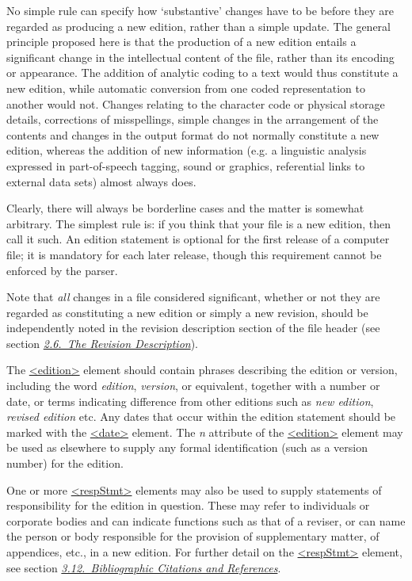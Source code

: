 No simple rule can specify how ‘substantive’ changes have to be before they are regarded as producing a new edition, rather than a simple update. The general principle proposed here is that the production of a new edition entails a significant change in the intellectual content of the file, rather than its encoding or appearance. The addition of analytic coding to a text would thus constitute a new edition, while automatic conversion from one coded representation to another would not. Changes relating to the character code or physical storage details, corrections of misspellings, simple changes in the arrangement of the contents and changes in the output format do not normally constitute a new edition, whereas the addition of new information (e.g. a linguistic analysis expressed in part-of-speech tagging, sound or graphics, referential links to external data sets) almost always does.\par
Clearly, there will always be borderline cases and the matter is somewhat arbitrary. The simplest rule is: if you think that your file is a new edition, then call it such. An edition statement is optional for the first release of a computer file; it is mandatory for each later release, though this requirement cannot be enforced by the parser. \par
Note that \textit{all} changes in a file considered significant, whether or not they are regarded as constituting a new edition or simply a new revision, should be independently noted in the revision description section of the file header (see section \textit{\hyperref[HD6]{2.6.\ The Revision Description}}).\par
The \hyperref[TEI.edition]{<edition>} element should contain phrases describing the edition or version, including the word \textit{edition}, \textit{version}, or equivalent, together with a number or date, or terms indicating difference from other editions such as \textit{new edition}, \textit{revised edition} etc. Any dates that occur within the edition statement should be marked with the \hyperref[TEI.date]{<date>} element. The {\itshape n} attribute of the \hyperref[TEI.edition]{<edition>} element may be used as elsewhere to supply any formal identification (such as a version number) for the edition.\par
One or more \hyperref[TEI.respStmt]{<respStmt>} elements may also be used to supply statements of responsibility for the edition in question. These may refer to individuals or corporate bodies and can indicate functions such as that of a reviser, or can name the person or body responsible for the provision of supplementary matter, of appendices, etc., in a new edition. For further detail on the \hyperref[TEI.respStmt]{<respStmt>} element, see section \textit{\hyperref[COBI]{3.12.\ Bibliographic Citations and References}}.\par
